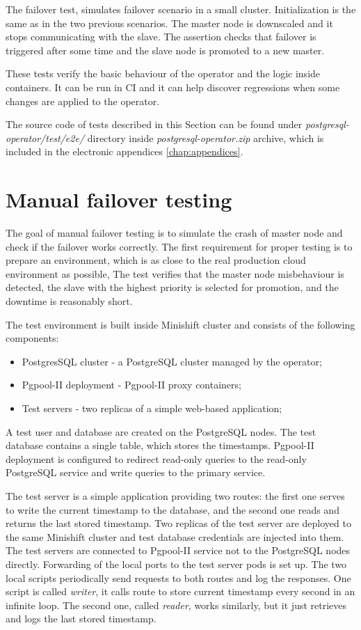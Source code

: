 \documentclass[
  digital, %
  twoside, %
  table,   %
  lof,     %
  lot,     %
]{fithesis3}
\begin{document}
The failover test, simulates failover scenario in a small cluster. Initialization is the same as in the two previous scenarios. The master node is downscaled and it stops communicating with the slave. The assertion checks that failover is triggered after some time and the slave node is promoted to a new master.

These tests verify the basic behaviour of the operator and the logic inside containers. It can be run in CI and it can help discover regressions when some changes are applied to the operator.

The source code of tests described in this Section can be found under \textit{postgresql-operator/test/e2e/} directory inside \textit{postgresql-operator.zip} archive, which is included in the electronic appendices \ref{chap:appendices}.

\section{Manual failover testing}
The goal of manual failover testing is to simulate the crash of master node and check if the failover works correctly. The first requirement for proper testing is to prepare an environment, which is as close to the real production cloud environment as possible, The test verifies that the master node misbehaviour is detected, the slave with the highest priority is selected for promotion, and the downtime is reasonably short.

The test environment is built inside Minishift cluster and consists of the following components:
\begin{itemize}
  \item PostgresSQL cluster - a PostgreSQL cluster managed by the operator;
  \item Pgpool-II deployment - Pgpool-II proxy containers;
  \item Test servers - two replicas of a simple web-based application;
\end{itemize}

A test user and database are created on the PostgreSQL nodes. The test database contains a single table, which stores the timestamps. Pgpool-II deployment is configured to redirect read-only queries to the read-only PostgreSQL service and write queries to the primary service.

The test server is a simple application providing two routes: the first one serves to write the current timestamp to the database, and the second one reads and returns the last stored timestamp. Two replicas of the test server are deployed to the same Minishift cluster and test database credentials are injected into them. The test servers are connected to Pgpool-II service not to the PostgreSQL nodes directly. Forwarding of the local ports to the test server pods is set up. The two local scripts periodically send requests to both routes and log the responses. One script is called \textit{writer}, it calls route to store current timestamp every second in an infinite loop. The second one, called \textit{reader}, works similarly, but it just retrieves and logs the last stored timestamp.
\end{document}
